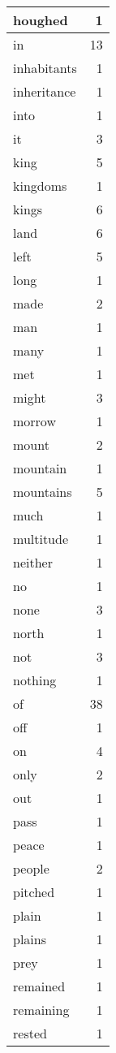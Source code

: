 \begin{center}
\begin{longtable}{l|r}
houghed & 1 \\ \hline
in & 13 \\ \hline
inhabitants & 1 \\ \hline
inheritance & 1 \\ \hline
into & 1 \\ \hline
it & 3 \\ \hline
king & 5 \\ \hline
kingdoms & 1 \\ \hline
kings & 6 \\ \hline
land & 6 \\ \hline
left & 5 \\ \hline
long & 1 \\ \hline
made & 2 \\ \hline
man & 1 \\ \hline
many & 1 \\ \hline
met & 1 \\ \hline
might & 3 \\ \hline
morrow & 1 \\ \hline
mount & 2 \\ \hline
mountain & 1 \\ \hline
mountains & 5 \\ \hline
much & 1 \\ \hline
multitude & 1 \\ \hline
neither & 1 \\ \hline
no & 1 \\ \hline
none & 3 \\ \hline
north & 1 \\ \hline
not & 3 \\ \hline
nothing & 1 \\ \hline
of & 38 \\ \hline
off & 1 \\ \hline
on & 4 \\ \hline
only & 2 \\ \hline
out & 1 \\ \hline
pass & 1 \\ \hline
peace & 1 \\ \hline
people & 2 \\ \hline
pitched & 1 \\ \hline
plain & 1 \\ \hline
plains & 1 \\ \hline
prey & 1 \\ \hline
remained & 1 \\ \hline
remaining & 1 \\ \hline
rested & 1 \\ \hline

\end{longtable}
\end{center}
